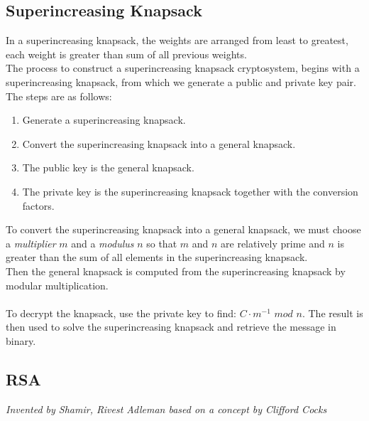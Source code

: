 \documentclass{article}
\begin{document}
\subsection{Superincreasing Knapsack}
In a superincreasing knapsack, the weights are arranged from least to greatest, each weight is greater than sum of all previous weights.\\
The process to construct a superincreasing knapsack cryptosystem, begins with a superincreasing knapsack, from which we generate a public and private key pair. The steps are as follows:

\begin{enumerate}
    \item Generate a superincreasing knapsack.
    \item Convert the superincreasing knapsack into a general knapsack.
    \item The public key is the general knapsack.
    \item The private key is the superincreasing knapsack together with the conversion factors.
\end{enumerate}

To convert the superincreasing knapsack into a general knapsack, we must choose a \textit{multiplier} $m$ and a \textit{modulus} $n$ so that $m$ and $n$ are relatively prime and $n$ is greater than the sum of all elements in the superincreasing knapsack.\\
Then the general knapsack is computed from the superincreasing knapsack by modular multiplication.\\\\
To decrypt the knapsack, use the private key to find: $C \cdot m^{-1}$ $mod$ $n$. The result is then used to solve the superincreasing knapsack and retrieve the message in binary.

\subsection{RSA}
\begin{center}
    \textit{Invented by Shamir, Rivest Adleman based on a concept by Clifford Cocks}
\end{center}
\end{document}
